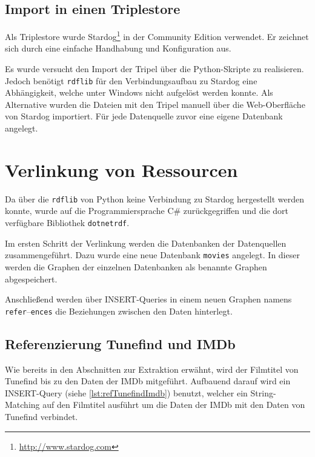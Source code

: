 \documentclass[parskip]{scrartcl}
\begin{document}
\subsection{Import in einen Triplestore}
Als Triplestore wurde Stardog\footnote{\url{http://www.stardog.com}} in der Community Edition verwendet. Er zeichnet sich durch eine einfache Handhabung und Konfiguration aus.

Es wurde versucht den Import der Tripel über die Python-Skripte zu realisieren. Jedoch benötigt \texttt{rdflib} für den Verbindungsaufbau zu Stardog eine Abhängigkeit, welche unter Windows nicht aufgelöst werden konnte. Als Alternative wurden die Dateien mit den Tripel manuell über die Web-Oberfläche von Stardog importiert. Für jede Datenquelle zuvor eine eigene Datenbank angelegt.

\section{Verlinkung von Ressourcen}

Da über die \texttt{rdflib} von Python keine Verbindung zu Stardog hergestellt werden konnte, wurde auf die Programmiersprache C\# zurückgegriffen und die dort verfügbare Bibliothek \texttt{dotnetrdf}.

Im ersten Schritt der Verlinkung werden die Datenbanken der Datenquellen zusammengeführt. Dazu wurde eine neue Datenbank \texttt{movies} angelegt. In dieser werden die Graphen der einzelnen Datenbanken als benannte Graphen abgespeichert.

Anschließend werden über INSERT-Queries in einem neuen Graphen namens \texttt{refer}--\texttt{ences} die Beziehungen zwischen den Daten hinterlegt.

\subsection{Referenzierung Tunefind und IMDb}
Wie bereits in den Abschnitten zur Extraktion erwähnt, wird der Filmtitel von Tunefind bis zu den Daten der IMDb mitgeführt. Aufbauend darauf wird ein INSERT-Query (siehe \autoref{lst:refTunefindImdb}) benutzt, welcher ein String-Matching auf den Filmtitel ausführt um die Daten der IMDb mit den Daten von Tunefind verbindet. 
\end{document}
